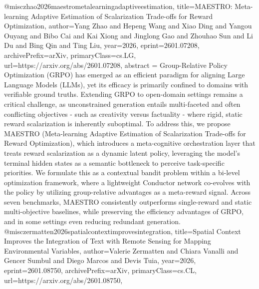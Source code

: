 {}@misc{zhao2026maestrometalearningadaptiveestimation,
      title={MAESTRO: Meta-learning Adaptive Estimation of Scalarization Trade-offs for Reward Optimization}, 
      author={Yang Zhao and Hepeng Wang and Xiao Ding and Yangou Ouyang and Bibo Cai and Kai Xiong and Jinglong Gao and Zhouhao Sun and Li Du and Bing Qin and Ting Liu},
      year={2026},
      eprint={2601.07208},
      archivePrefix={arXiv},
      primaryClass={cs.LG},
      url={https://arxiv.org/abs/2601.07208},
      abstract = {Group-Relative Policy Optimization (GRPO) has emerged as an efficient paradigm for aligning Large Language Models (LLMs), yet its efficacy is primarily confined to domains with verifiable ground truths. Extending GRPO to open-domain settings remains a critical challenge, as unconstrained generation entails multi-faceted and often conflicting objectives - such as creativity versus factuality - where rigid, static reward scalarization is inherently suboptimal. To address this, we propose MAESTRO (Meta-learning Adaptive Estimation of Scalarization Trade-offs for Reward Optimization), which introduces a meta-cognitive orchestration layer that treats reward scalarization as a dynamic latent policy, leveraging the model's terminal hidden states as a semantic bottleneck to perceive task-specific priorities. We formulate this as a contextual bandit problem within a bi-level optimization framework, where a lightweight Conductor network co-evolves with the policy by utilizing group-relative advantages as a meta-reward signal. Across seven benchmarks, MAESTRO consistently outperforms single-reward and static multi-objective baselines, while preserving the efficiency advantages of GRPO, and in some settings even reducing redundant generation.}
}@misc{zermatten2026spatialcontextimprovesintegration,
      title={Spatial Context Improves the Integration of Text with Remote Sensing for Mapping Environmental Variables}, 
      author={Valerie Zermatten and Chiara Vanalli and Gencer Sumbul and Diego Marcos and Devis Tuia},
      year={2026},
      eprint={2601.08750},
      archivePrefix={arXiv},
      primaryClass={cs.CL},
      url={https://arxiv.org/abs/2601.08750},
}
